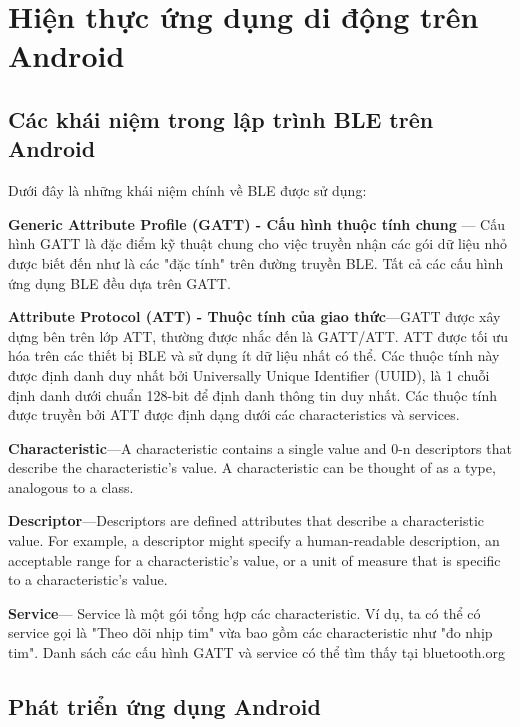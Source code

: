 \section{Hiện thực ứng dụng di động trên Android}

\subsection{Các khái niệm trong lập trình BLE trên Android}
Dưới đây là những khái niệm chính về BLE được sử dụng:

\textbf{Generic Attribute Profile (GATT) -  Cấu hình thuộc tính chung }— Cấu hình GATT là đặc điểm kỹ thuật chung cho việc truyền nhận các gói dữ liệu nhỏ được biết đến như là các "đặc tính" trên đường truyền BLE. Tất cả các cấu hình ứng dụng BLE đều dựa trên GATT.

\textbf{Attribute Protocol (ATT) - Thuộc tính của giao thức}—GATT được xây dựng bên trên lớp ATT, thường được nhắc đến là GATT/ATT. ATT được tối ưu hóa trên các thiết bị BLE và sử dụng ít dữ liệu nhất có thể. Các thuộc tính này được định danh duy nhất bởi Universally Unique Identifier (UUID), là 1 chuỗi định danh dưới chuẩn 128-bit để định danh thông tin duy nhất. Các thuộc tính được truyền bởi ATT được định dạng dưới các characteristics và services.

\textbf{Characteristic}—A characteristic contains a single value and 0-n descriptors that describe the characteristic's value. A characteristic can be thought of as a type, analogous to a class. 

\textbf{Descriptor}—Descriptors are defined attributes that describe a characteristic value. For example, a descriptor might specify a human-readable description, an acceptable range for a characteristic's value, or a unit of measure that is specific to a characteristic's value.

\textbf{Service}— Service là một gói tổng hợp các characteristic. Ví dụ, ta có thể có service gọi là "Theo dõi nhịp tim" vừa bao gồm các characteristic như "đo nhịp tim". Danh sách các cấu hình GATT và service có thể tìm thấy tại bluetooth.org

\subsection{Phát triển ứng dụng Android}
